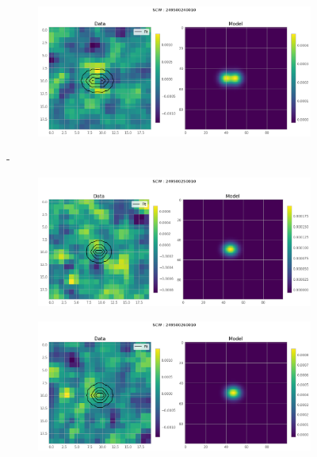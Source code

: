 \documentclass[
	a4paper, %
	10pt, %
	unnumberedsections, %
	twoside, %
]{LTJournalArticle}
\begin{document}
    \begin{figure}[H]
    \centering
    \begin{subfigure}{.47\textwidth}
        \includegraphics[width=\textwidth]{report/Figures/models/2404/24_psf_const.png}
    \end{subfigure}%
    \hspace{1em}-
    \begin{subfigure}{.47\textwidth}
        \centering
        \includegraphics[width=\textwidth]{report/Figures/models/2404/25_psf_const.png}
    \end{subfigure}
    \begin{subfigure}{.47\textwidth}
        \centering
        \includegraphics[width=\textwidth]{report/Figures/models/2404/26_psf_const.png}

\end{subfigure}
\end{figure}
\end{document}
